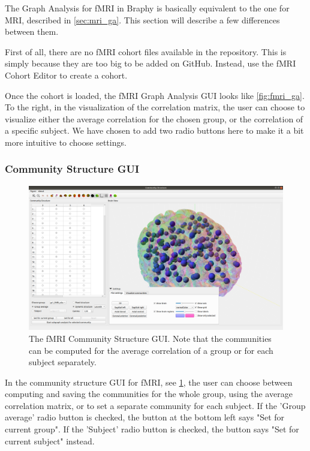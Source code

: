 \documentclass{article}
\begin{document}
The Graph Analysis for fMRI in Braphy is basically equivalent to the one for MRI, described in \cref{sec:mri_ga}. This section will describe a few differences between them. 

First of all, there are no fMRI cohort files available in the repository. This is simply because they are too big to be added on GitHub. Instead, use the fMRI Cohort Editor to create a cohort.

Once the cohort is loaded, the fMRI Graph Analysis GUI looks like \cref{fig:fmri_ga}. To the right, in the visualization of the correlation matrix, the user can choose to visualize either the average correlation for the chosen group, or the correlation of a specific subject. We have chosen to add two radio buttons here to make it a bit more intuitive to choose settings.

\subsubsection{Community Structure GUI}

\begin{figure}[h]
    \centering
    \includegraphics[width=\linewidth]{fmri_cs.png}
    \caption{The fMRI Community Structure GUI. Note that the communities can be computed for the average correlation of a group or for each subject separately.}
    \label{fig:fmri_cs}
\end{figure}


In the community structure GUI for fMRI, see \cref{fig:fmri_cs}, the user can choose between computing and saving the communities for the whole group, using the average correlation matrix, or to set a separate community for each subject. If the 'Group average' radio button is checked, the button at the bottom left says "Set for current group". If the 'Subject' radio button is checked, the button says "Set for current subject" instead. 
\end{document}
